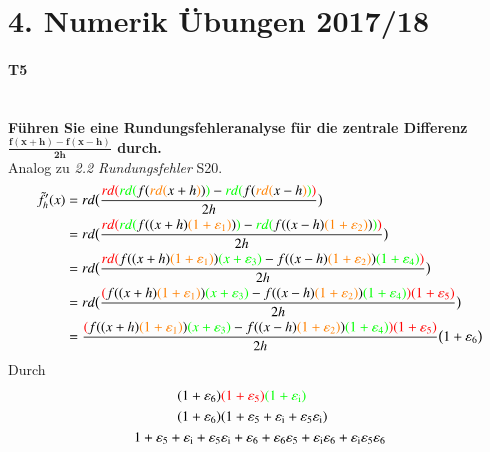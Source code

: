\documentclass[10pt,a4paper]{article}
\begin{document}
	\section*{4. Numerik Übungen 2017/18}
	\paragraph{T5}\mbox{}\\
	\textbf{Führen Sie eine Rundungsfehleranalyse für die zentrale Differenz $\mathbf{\frac{f(x+h)-f(x-h)}{2h}}$ durch.} \\
	Analog zu \emph{2.2 Rundungsfehler} S20.
	\begin{align*}
		\tilde{f}'_h(x) &= rd\bigl(\frac{{
				\color{red}rd(}{\color{green}rd(}f({\color{orange}rd(}x+h{\color{orange})}){\color{green})}
				-{\color{green}rd(}f({\color{orange}rd(}x-h{\color{orange})}{\color{green})}{\color{red})}}
				{2h}\bigr)  \\
			&= rd\bigl(\frac{{
					\color{red}rd(}{\color{green}rd(}f((x+h){\color{orange}(1+\varepsilon_1)}){\color{green})}
				-{\color{green}rd(}f((x-h){\color{orange}(1+\varepsilon_2)}){\color{green})}{\color{red})}}
			{2h}\bigr)  \\
			&= rd\bigl(
				 \frac{
					{\color{red}rd(} f((x+h){\color{orange}(1+\varepsilon_1)}){\color{green}(x+\varepsilon_3)}
					-f((x-h){\color{orange}(1+\varepsilon_2)}){\color{green}(1+\varepsilon_4)}{\color{red})}
				  }
				 {2h}
			    \bigr)  \\
			&= rd\bigl(
			\frac{
				{\color{red}(}f((x+h){\color{orange}(1+\varepsilon_1)}){\color{green}(x+\varepsilon_3)}
				-f((x-h){\color{orange}(1+\varepsilon_2)}){\color{green}(1+\varepsilon_4)}{\color{red})(1+\varepsilon_5)}
			}
			{2h}
			\bigr)  \\
			&= \frac{
				{\color{red}(}f((x+h){\color{orange}(1+\varepsilon_1)}){\color{green}(x+\varepsilon_3)}
				-f((x-h){\color{orange}(1+\varepsilon_2)}){\color{green}(1+\varepsilon_4)}{\color{red})(1+\varepsilon_5)}
			}
			{2h} \bigl(1+\varepsilon_6\bigr)
	\end{align*}
	Durch
	\begin{align*}
		(1+\varepsilon_6)&{\color{red}(1+\varepsilon_5)}{\color{green}(1+\varepsilon_\text{i})} \\
		(1+\varepsilon_6)&(1 + \varepsilon_5+\varepsilon_\text{i}+\varepsilon_5\varepsilon_\text{i})\\
		1 + \varepsilon_5 + \varepsilon_\text{i} + \varepsilon_5& \varepsilon_\text{i} +\varepsilon_6 + \varepsilon_6 \varepsilon_5 + \varepsilon_\text{i} \varepsilon_6 + \varepsilon_\text{i} \varepsilon_5 \varepsilon_6
	\end{align*}
\end{document}
